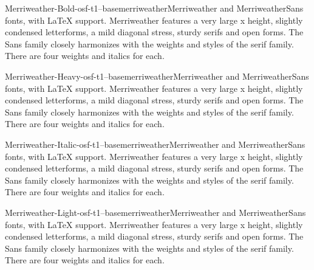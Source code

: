 \documentclass{ddltxtyp}
\begin{document}
\begin{package}{Merriweather-Bold-osf-t1--base}{merriweather}{Merriweather and MerriweatherSans fonts, with {\LaTeX} support.}
Merriweather features a very large x height, slightly condensed
letterforms, a mild diagonal stress, sturdy serifs and open
forms. The Sans family closely harmonizes with the weights and
styles of the serif family. There are four weights and italics
for each.
\end{package}
\begin{package}{Merriweather-Heavy-osf-t1--base}{merriweather}{Merriweather and MerriweatherSans fonts, with {\LaTeX} support.}
Merriweather features a very large x height, slightly condensed
letterforms, a mild diagonal stress, sturdy serifs and open
forms. The Sans family closely harmonizes with the weights and
styles of the serif family. There are four weights and italics
for each.
\end{package}
\begin{package}{Merriweather-Italic-osf-t1--base}{merriweather}{Merriweather and MerriweatherSans fonts, with {\LaTeX} support.}
Merriweather features a very large x height, slightly condensed
letterforms, a mild diagonal stress, sturdy serifs and open
forms. The Sans family closely harmonizes with the weights and
styles of the serif family. There are four weights and italics
for each.
\end{package}
\begin{package}{Merriweather-Light-osf-t1--base}{merriweather}{Merriweather and MerriweatherSans fonts, with {\LaTeX} support.}
Merriweather features a very large x height, slightly condensed
letterforms, a mild diagonal stress, sturdy serifs and open
forms. The Sans family closely harmonizes with the weights and
styles of the serif family. There are four weights and italics
for each.
\end{package}
\end{document}
